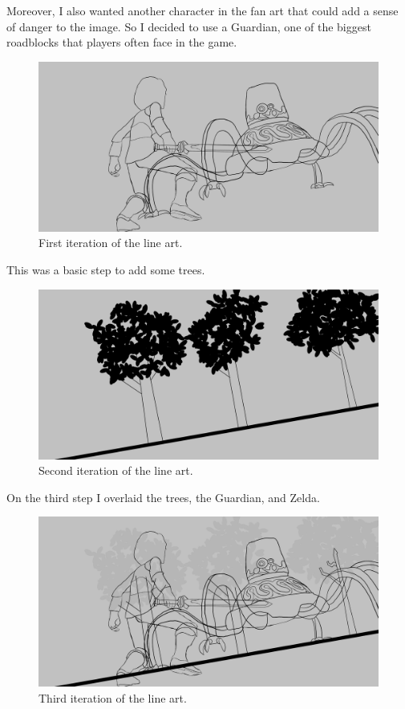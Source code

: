 \documentclass{cup-pan}
\begin{document}
        Moreover, I also wanted another character in the fan art that could add a sense of danger to the image. So I decided to use a Guardian, one of the biggest roadblocks that players often face in the game.\\

        \begin{figure}[H]
            \includegraphics[width=\textwidth]{Imagenes/Fanart2/Boceto_Lineart/I Iteracion_LineArt.png}
            \caption{First iteration of the line art.}
        \end{figure}

        This was a basic step to add some trees.
        \begin{figure}[H]
            \includegraphics[width=\textwidth]{Imagenes/Fanart2/Boceto_Lineart/II Iteracion_LineArt.png}
            \caption{Second iteration of the line art.}
        \end{figure}

        On the third step I overlaid the trees, the Guardian, and Zelda. 
        \begin{figure}[H]
            \includegraphics[width=\textwidth]{Imagenes/Fanart2/Boceto_Lineart/III Iteracion_2o_FanArt_LineArt.png}
            \caption{Third iteration of the line art.}
        \end{figure}
\end{document}
